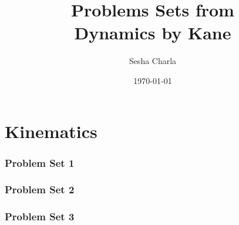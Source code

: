 





\title{Problems Sets from\\Dynamics by Kane}
\author{Sesha Charla}
\date{\today}



\maketitle
\tableofcontents
\newpage
\part{Kinematics}
\section{Problem Set 1}








\newpage
\section{Problem Set 2}









\newpage
\section{Problem Set 3}












\newpage



